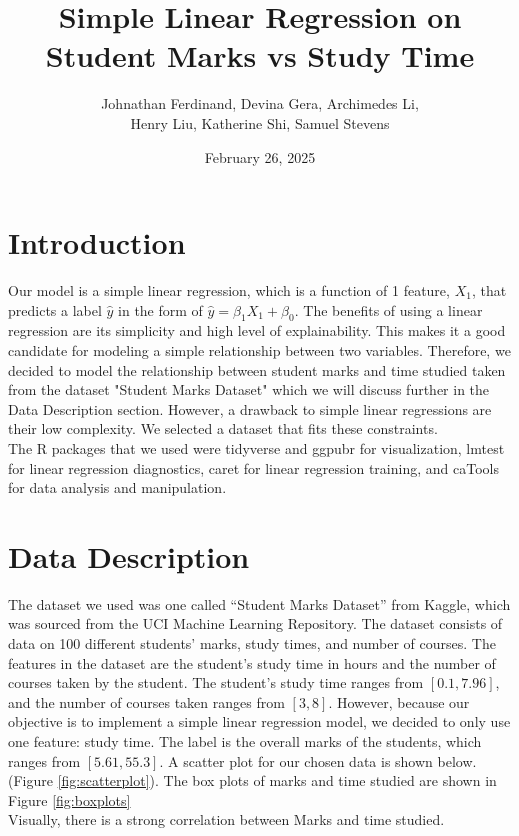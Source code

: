 \documentclass{article}
\title{Simple Linear Regression on Student Marks vs Study Time}
\author{Johnathan Ferdinand, Devina Gera, Archimedes Li, \\ Henry Liu, Katherine Shi, Samuel Stevens}
\date{February 26, 2025}
\begin{document}
\maketitle

\section{Introduction}
Our model is a simple linear regression, which is a function of 1 feature, $X_1$, that predicts a label $\hat{y}$ in the form of $\hat{y} = \beta_1X_1 + \beta_0$.  
The benefits of using a linear regression are its simplicity and high level of explainability.  
This makes it a good candidate for modeling a simple relationship between two variables.  
Therefore, we decided to model the relationship between student marks and time studied taken from the dataset "Student Marks Dataset" which we will discuss further in the Data Description section.
However, a drawback to simple linear regressions are their low complexity.  We selected a dataset that fits these constraints. \\

\noindent The R packages that we used were tidyverse and ggpubr for visualization, lmtest for linear regression diagnostics, caret for linear regression training, and caTools for data analysis and manipulation.

\section{Data Description}
The dataset we used was one called “Student Marks Dataset” from Kaggle, which was sourced from the UCI Machine Learning Repository. The dataset consists of data on 100 different students' marks, study times, and number of courses.  
The features in the dataset are the student’s study time in hours and the number of courses taken by the student.  
The student’s study time ranges from $[0.1, 7.96]$, and the number of courses taken ranges from $[3, 8]$. 
However, because our objective is to implement a simple linear regression model, we decided to only use one feature: study time.
The label is the overall marks of the students, which ranges from $[5.61, 55.3]$.  
A scatter plot for our chosen data is shown below. 
(Figure \ref{fig:scatterplot}). The box plots of marks and time studied are shown in Figure \ref{fig:boxplots} \\
\noindent Visually, there is a strong correlation between Marks and time studied. \\
\end{document}
